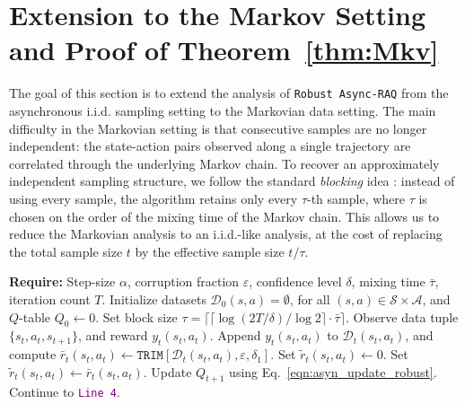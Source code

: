 \documentclass{article}
\begin{document}
\section{Extension to the Markov Setting and Proof of Theorem~\ref{thm:Mkv}}
\label{app:Markov}
The goal of this section is to extend the analysis of \texttt{Robust Async-RAQ} from the asynchronous i.i.d. sampling setting to the Markovian data setting. The main difficulty in the Markovian setting is that consecutive samples are no longer independent: the state-action pairs observed along a single trajectory are correlated through the underlying Markov chain. To recover an approximately independent sampling structure, we follow the standard \emph{blocking} idea \cite{dorfman}: instead of using every sample, the algorithm retains only every \(\tau\)-th sample, where \(\tau\) is chosen on the order of the mixing time of the Markov chain. This allows us to reduce the Markovian analysis to an i.i.d.-like analysis, at the cost of replacing the total sample size \(t\) by the effective sample size \(t/\tau\).
\begin{algorithm}[H]
\caption{Robust Asynchronous \(Q\)-learning Algorithm--\textcolor{winered}{Markovian} \texttt{(Robust Async-RAQ-\textcolor{winered}{M})}}
\label{algo:algo_Markov}
\begin{algorithmic}[1]
    \STATE \textbf{Require:} Step-size \( \alpha \), corruption fraction \( \varepsilon \), confidence level \( \delta \), mixing time \(\bar{\tau}\), iteration count \( T \). 
    \STATE Initialize datasets \( \mathcal{D}_0(s,a) = \emptyset \), for all \( (s,a) \in \mathcal{S} \times \mathcal{A} \), and \(Q\)-table \( Q_0 \gets 0 \).
    \STATE Set block size \( \tau = \lceil  \lceil\log(2T/\delta)/\log 2\rceil \cdot \bar{\tau} \rceil \).
        \STATE Observe data tuple \( \{s_t, a_t, s_{t+1}\} \), and reward \( y_t(s_t, a_t) \).
            \STATE Append \( y_t(s_t, a_t) \) to \( \mathcal{D}_t(s_t, a_t) \), and compute
            \( \bar{r}_t(s_t, a_t) \leftarrow \texttt{TRIM}[\mathcal{D}_t(s_t,a_t), \varepsilon, \delta_1] \).
                \STATE Set \( \tilde{r}_t(s_t, a_t) \leftarrow 0 \).
            \ELSE
                \STATE Set \( \tilde{r}_t(s_t, a_t) \leftarrow \bar{r}_t(s_t, a_t) \).
            \ENDIF
            \STATE Update \( Q_{t+1} \) using Eq.~\eqref{eqn:asyn_update_robust}.
        \ELSE
            \STATE Continue to \texttt{\textcolor{purple}{Line 4}}.
        \ENDIF
    \ENDFOR
\end{algorithmic}
\end{algorithm}
\end{document}
